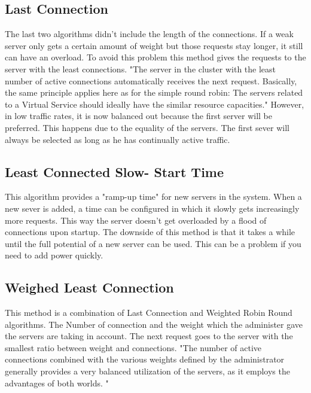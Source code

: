\documentclass[12p]{article}
\begin{document}
	\subsection{Last Connection}
	The last two algorithms didn't include the length of the connections. If a weak server only gets a certain amount of weight but those requests stay longer, it still can have an overload. To avoid this problem this method gives the requests to the server with the least connections. "The server  in the cluster with the least number of active connections automatically receives the next  request. Basically, the same principle applies here as for the simple round robin: The servers  related to a Virtual Service should ideally have the similar resource capacities."\cite{schedu} However, in low traffic rates, it is now balanced out because the first server will be preferred. This happens due to the equality of the servers. The first sever will always be selected as long as he has continually active traffic. 
	
	\subsection{Least Connected Slow- Start Time}
	This algorithm provides a "ramp-up time" for new servers in the system. When a new sever is added, a time can be configured in which it slowly gets increasingly more requests. This way the server doesn't get overloaded by a flood of connections upon startup. The downside of this method is that it takes a while until the full potential of a new server can be used. This can be a problem if you need to add power quickly. 
	
	\subsection{Weighed Least Connection}
	This method is a combination of Last Connection and Weighted Robin Round algorithms. The Number of connection and the weight which the administer gave the servers are taking in account. The next request goes to the server with the smallest ratio between weight and connections. "The number of active connections combined with the various weights defined by the  administrator generally provides a very balanced utilization of the servers, as it employs the  advantages of both worlds. "\cite{schedu}
	
\end{document}
